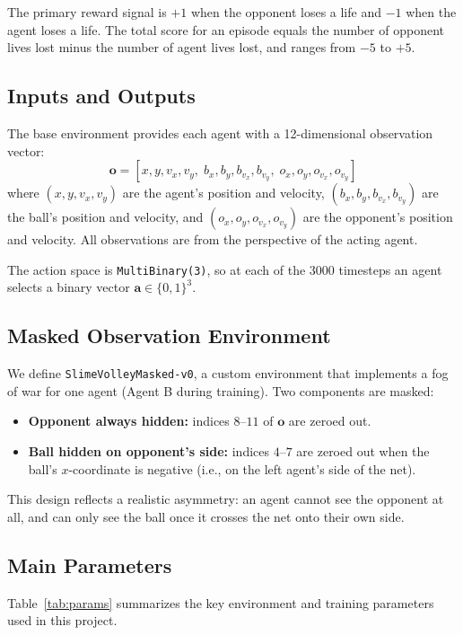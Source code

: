 \documentclass[conference]{IEEEtran}
\begin{document}
The primary reward signal is $+1$ when the opponent loses a life and $-1$ when the agent loses a life. The total score for an episode equals the number of opponent lives lost minus the number of agent lives lost, and ranges from $-5$ to $+5$.

\subsection{Inputs and Outputs}

The base environment provides each agent with a 12-dimensional observation vector:
\[
  \mathbf{o} = [x, y, v_x, v_y,\; b_x, b_y, b_{v_x}, b_{v_y},\; o_x, o_y, o_{v_x}, o_{v_y}]
\]
where $(x, y, v_x, v_y)$ are the agent's position and velocity, $(b_x, b_y, b_{v_x}, b_{v_y})$ are the ball's position and velocity, and $(o_x, o_y, o_{v_x}, o_{v_y})$ are the opponent's position and velocity. All observations are from the perspective of the acting agent.

The action space is \texttt{MultiBinary(3)}, so at each of the 3000 timesteps an agent selects a binary vector $\mathbf{a} \in \{0,1\}^3$.

\subsection{Masked Observation Environment}

We define \texttt{SlimeVolleyMasked-v0}, a custom environment that implements a fog of war for one agent (Agent B during training). Two components are masked:
\begin{itemize}
    \item \textbf{Opponent always hidden:} indices $8$--$11$ of $\mathbf{o}$ are zeroed out.
    \item \textbf{Ball hidden on opponent's side:} indices $4$--$7$ are zeroed out when the ball's $x$-coordinate is negative (i.e., on the left agent's side of the net).
\end{itemize}

This design reflects a realistic asymmetry: an agent cannot see the opponent at all, and can only see the ball once it crosses the net onto their own side.

\subsection{Main Parameters}

Table~\ref{tab:params} summarizes the key environment and training parameters used in this project.
\end{document}
